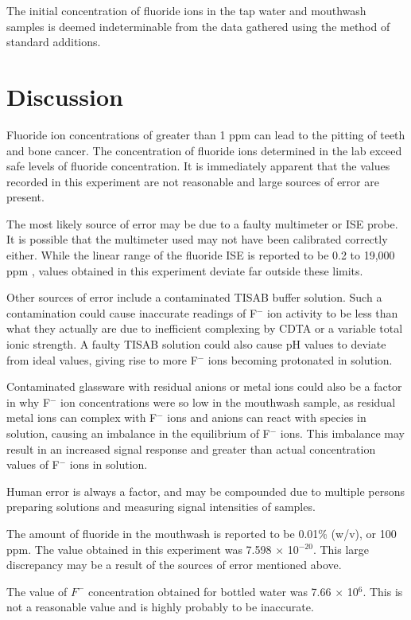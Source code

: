 \documentclass{article}
\begin{document}
The initial concentration of fluoride ions in the tap water and mouthwash
samples is deemed indeterminable from the data gathered using the method of
standard additions.

\newpage
\section {Discussion}
Fluoride ion concentrations of greater than 1 ppm can lead to the pitting of
teeth and bone cancer.
The concentration of fluoride ions determined in the lab exceed safe levels of
fluoride concentration. It is immediately apparent that the values recorded in
this experiment are not reasonable and large sources of error are present.

The most likely source of error may be due to a faulty multimeter or ISE probe. It is possible
that the multimeter used may not have been calibrated correctly either. While
the linear range of the fluoride ISE is reported to be 0.2 to 19,000 ppm
\cite{lab_man}, values obtained in this experiment deviate far outside these
limits.

Other sources of error include a contaminated TISAB buffer solution. Such a
contamination could cause inaccurate readings of F$^-$ ion activity to be
less than what they actually are due to inefficient complexing
by CDTA or a variable total ionic strength. 
A faulty TISAB solution could also cause pH values to deviate from
ideal values, giving rise to more F$^-$ ions becoming protonated in solution.

Contaminated glassware with residual anions or metal ions could also be a factor
in why F$^-$ ion concentrations were so low in the mouthwash sample, as residual
metal ions can complex with F$^-$ ions and anions can react with species in
solution, causing an imbalance in the equilibrium of F$^-$ ions. This imbalance
may result in an increased signal response and greater than actual concentration
values of F$^-$ ions in solution.

Human error is always a factor, and may be compounded due to multiple persons
preparing solutions and measuring signal intensities of samples.

The amount of fluoride in the mouthwash is reported to be 0.01\% (w/v), or 100
ppm. \cite{lab_man} The value obtained in this experiment was 7.598 $\times$ 10$^{-20}$. This
large discrepancy may be a result of the sources of error mentioned above.

The value of $F^-$ concentration obtained for bottled water was 7.66 $\times$
10$^6$. This is not a reasonable value and is highly probably to be inaccurate.
\end{document}
